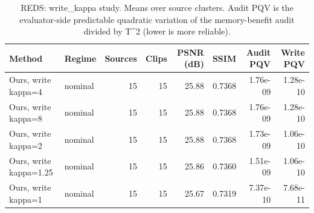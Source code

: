 \begin{table}[t]
\centering
\caption{REDS: write\_kappa study. Means over source clusters. Audit PQV is the evaluator-side predictable quadratic variation of the memory-benefit audit divided by T^2 (lower is more reliable).}
\label{tab:write_kappa_REDS}
\small
\begin{tabular}{llrrrrrr}
\toprule
Method & Regime & Sources & Clips & PSNR (dB) & SSIM & Audit PQV & Write PQV \\
\midrule
Ours, write kappa=4 & nominal & 15 & 15 & 25.88 & 0.7368 & 1.76e-09 & 1.28e-10 \\
Ours, write kappa=8 & nominal & 15 & 15 & 25.88 & 0.7368 & 1.76e-09 & 1.28e-10 \\
Ours, write kappa=2 & nominal & 15 & 15 & 25.88 & 0.7368 & 1.73e-09 & 1.06e-10 \\
Ours, write kappa=1.25 & nominal & 15 & 15 & 25.86 & 0.7360 & 1.51e-09 & 1.06e-10 \\
Ours, write kappa=1 & nominal & 15 & 15 & 25.67 & 0.7319 & 7.37e-10 & 7.68e-11 \\
\bottomrule
\end{tabular}
\end{table}
